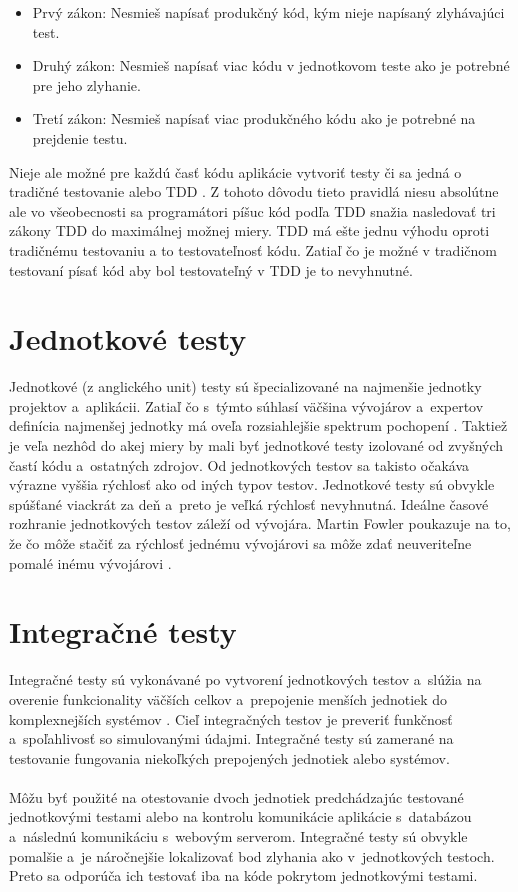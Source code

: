 \documentclass[
  digital, %
  table,   %
oneside,
  nolof,     %
  nolot,     %
]{fithesis3}
\begin{document}
\begin{itemize}
	\item Prvý zákon: Nesmieš napísať produkčný kód, kým nieje napísaný zlyhávajúci test.
	\item Druhý zákon: Nesmieš napísať viac kódu v jednotkovom teste ako je potrebné pre jeho zlyhanie.
	\item Tretí zákon: Nesmieš napísať viac produkčného kódu ako je potrebné na prejdenie testu. 
\end{itemize} 
Nieje ale možné pre každú časť kódu aplikácie vytvoriť testy či sa jedná o tradičné testovanie alebo TDD \cite{untestable code}. Z tohoto dôvodu tieto pravidlá niesu absolútne ale vo všeobecnosti sa programátori píšuc kód podľa TDD snažia nasledovať tri zákony TDD do maximálnej možnej miery.
TDD má ešte jednu výhodu oproti tradičnému testovaniu a to testovateľnosť kódu. Zatiaľ čo je možné v tradičnom testovaní písať kód aby bol testovateľný v TDD je to nevyhnutné. 

\section{Jednotkové testy}
Jednotkové (z anglického unit) testy sú špecializované na najmenšie jednotky projektov a~aplikácii. Zatiaľ čo s~týmto súhlasí väčšina vývojárov a~expertov definícia najmenšej jednotky má oveľa rozsiahlejšie spektrum pochopení \cite{codeMaintability}\cite{effectiveSoftwareTesting}. Taktiež je veľa nezhôd do akej miery by mali byť jednotkové testy izolované od zvyšných častí kódu a~ostatných zdrojov. Od jednotkových testov sa takisto očakáva výrazne vyššia rýchlosť ako od iných typov testov. Jednotkové testy sú obvykle spúšťané viackrát za deň a~preto je veľká rýchlosť nevyhnutná. Ideálne časové rozhranie jednotkových testov záleží od vývojára. Martin Fowler poukazuje na to, že čo môže stačiť za rýchlosť jednému vývojárovi sa môže zdať neuveriteľne pomalé inému vývojárovi \cite{unitTest}.
\section{Integračné testy}
Integračné testy sú vykonávané po vytvorení jednotkových testov a~slúžia na overenie funkcionality väčších celkov a~prepojenie menších jednotiek do komplexnejších systémov \cite{testSeparation}. Cieľ integračných testov je preveriť funkčnosť a~spoľahlivosť so simulovanými údajmi. Integračné testy sú zamerané na testovanie fungovania niekoľkých prepojených jednotiek alebo systémov.\paragraph{}
Môžu byť použité na otestovanie dvoch jednotiek predchádzajúc testované jednotkovými testami alebo na kontrolu komunikácie aplikácie s~databázou a~následnú komunikáciu s~webovým serverom. Integračné testy sú obvykle pomalšie a~je náročnejšie lokalizovať bod zlyhania ako v~jednotkových  testoch. Preto sa odporúča ich testovať iba na kóde pokrytom jednotkovými testami.
\end{document}

